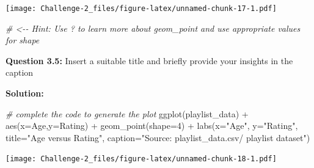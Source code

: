 \documentclass[
]{article}
\newenvironment{Shaded}{\begin{snugshade}}{\end{snugshade}}
\newcommand{\AttributeTok}[1]{\textcolor[rgb]{0.77,0.63,0.00}{#1}}
\newcommand{\CommentTok}[1]{\textcolor[rgb]{0.56,0.35,0.01}{\textit{#1}}}
\newcommand{\DecValTok}[1]{\textcolor[rgb]{0.00,0.00,0.81}{#1}}
\newcommand{\FunctionTok}[1]{\textcolor[rgb]{0.00,0.00,0.00}{#1}}
\newcommand{\NormalTok}[1]{#1}
\newcommand{\SpecialCharTok}[1]{\textcolor[rgb]{0.00,0.00,0.00}{#1}}
\newcommand{\StringTok}[1]{\textcolor[rgb]{0.31,0.60,0.02}{#1}}
\begin{document}
\texttt{[image: Challenge-2\_files/figure-latex/unnamed-chunk-17-1.pdf]}

\begin{Shaded}
\begin{Highlighting}[]
\CommentTok{\# \textless{}{-}{-} Hint: Use ? to learn more about geom\_point and use appropriate values for shape}
\end{Highlighting}
\end{Shaded}

\textbf{Question 3.5:} Insert a suitable title and briefly provide your
insights in the caption

\textbf{Solution:}

\begin{Shaded}
\begin{Highlighting}[]
\CommentTok{\# complete the code to generate the plot}
\FunctionTok{ggplot}\NormalTok{(playlist\_data) }\SpecialCharTok{+}
  \FunctionTok{aes}\NormalTok{(}\AttributeTok{x=}\NormalTok{Age,}\AttributeTok{y=}\NormalTok{Rating) }\SpecialCharTok{+}
    \FunctionTok{geom\_point}\NormalTok{(}\AttributeTok{shape=}\DecValTok{4}\NormalTok{) }\SpecialCharTok{+}
      \FunctionTok{labs}\NormalTok{(}\AttributeTok{x=}\StringTok{"Age"}\NormalTok{,}
              \AttributeTok{y=}\StringTok{"Rating"}\NormalTok{,}
                \AttributeTok{title=}\StringTok{"Age versus Rating"}\NormalTok{,}
                  \AttributeTok{caption=}\StringTok{"Source: playlist\_data.csv/ playlist dataset"}\NormalTok{)}
\end{Highlighting}
\end{Shaded}

\texttt{[image: Challenge-2\_files/figure-latex/unnamed-chunk-18-1.pdf]}
\end{document}
